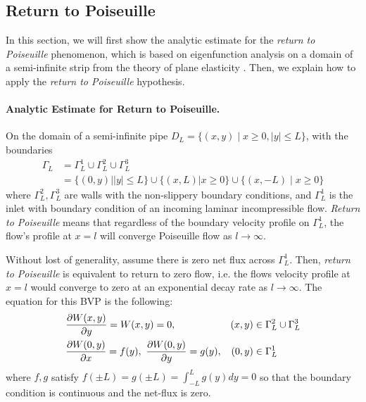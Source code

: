 \documentclass[10pt,twocolumn]{article}
\begin{document}
\subsection{Return to Poiseuille\label{sec:ret2poi}} 

In this section, we will first show the analytic estimate for the \textit{return to Poiseuille} phenomenon,
which is based on eigenfunction analysis on a domain of a semi-infinite strip from the theory of plane elasticity 
\cite{gregoryTractionBoundaryValue1980}. 
Then, we explain how to apply the \textit{return to Poiseuille} hypothesis. 

\paragraph*{Analytic Estimate for Return to Poiseuille. }

On the domain of a semi-infinite pipe $D_L = \{(x,y)\mid x \ge 0, |y| \le L\}$, with the boundaries 
\begin{align}
  \Gamma_L &= \Gamma_L^1 \cup \Gamma_L^2 \cup \Gamma_L^3 \\
  &=\{(0,y)||y| \le L \} \cup \{(x,L)|x\ge 0\} \cup \{(x,-L)\mid x\ge 0\}\nonumber
\end{align}
where $\Gamma_L^2,\Gamma_L^3$ are walls with the non-slippery boundary conditions, 
and $\Gamma_L^1$ is the inlet with boundary condition of an
incoming laminar incompressible flow. 
\textit{Return to Poiseuille} means that regardless of the boundary velocity profile on $\Gamma_L^1$,
the flow's profile at $x = l$ will converge Poiseuille flow as $l\to\infty$. 

Without lost of generality, assume there is zero net flux across $\Gamma_L^1$. 
Then, \textit{return to Poiseuille} is equivalent to return to zero flow, i.e. the flows velocity profile at $x=l$ would converge to zero at an exponential decay rate as $l\to\infty$. The equation for this BVP
is the following:
\begin{align}
  &\pdv{W(x,y)}{y}  = W(x,y) = 0,  &(x,y) &\in \Gamma_L^2 \cup \Gamma_L^3 \\
  &\pdv{W(0,y)}{x}  = f(y),\ \pdv{W(0,y)}{y} = g(y), &(0,y) &\in \Gamma_L^1  \label{eq:velocity-condition-at-inlet}
\end{align}
where $f,g$ satisfy $f(\pm L) = g(\pm L) = \int_{-L}^L g(y)dy = 0$ so that the boundary condition is continuous and the net-flux is zero. 
\end{document}
